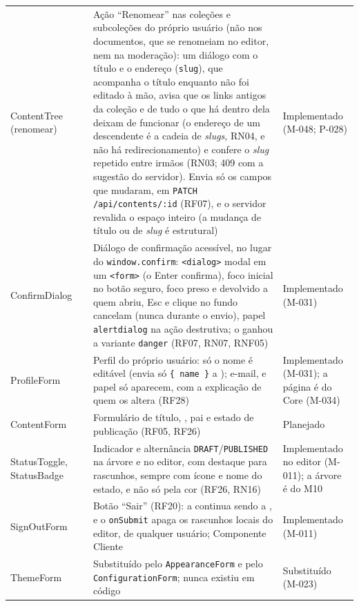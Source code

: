 \begin{longtable}{@{}L{3.3cm}L{2.9cm}L{6.0cm}L{2.2cm}@{}}
ContentTree (renomear) &  & Ação ``Renomear'' nas coleções e subcoleções do próprio usuário (não nos documentos, que se renomeiam no editor, nem na moderação): um diálogo com o título e o endereço (\texttt{slug}), que acompanha o título enquanto não foi editado à mão, avisa que os links antigos da coleção e de tudo o que há dentro dela deixam de funcionar (o endereço de um descendente é a cadeia de \emph{slugs}, RN04, e não há redirecionamento) e confere o \emph{slug} repetido entre irmãos (RN03; 409  com a sugestão do servidor). Envia só os campos que mudaram, em \texttt{PATCH /api/contents/:id} (RF07), e o servidor revalida o espaço inteiro (a mudança de título ou de \emph{slug} é estrutural) & Implementado (M-048; P-028)\\
ConfirmDialog &  & Diálogo de confirmação acessível, no lugar do \texttt{window.confirm}: \texttt{<dialog>} modal em um \texttt{<form>} (o Enter confirma), foco inicial no botão seguro, foco preso e devolvido a quem abriu, Esc e clique no fundo cancelam (nunca durante o envio), papel \texttt{alertdialog} na ação destrutiva; o  ganhou a variante \texttt{danger} (RF07, RN07, RNF05) & Implementado (M-031)\\
ProfileForm &  & Perfil do próprio usuário: só o nome é editável (envia só \texttt{\{ name \}} a ); e-mail,  e papel só aparecem, com a explicação de quem os altera (RF28) & Implementado (M-031); a página  é do Core (M-034)\\
ContentForm &  & Formulário de título, , pai e estado de publicação (RF05, RF26) & Planejado\\
StatusToggle, StatusBadge &  & Indicador e alternância \texttt{DRAFT}/\texttt{PUBLISHED} na árvore e no editor, com destaque para rascunhos, sempre com ícone e nome do estado, e não só pela cor (RF26, RN16) & Implementado no editor (M-011); a árvore é do M10\\
SignOutForm &  & Botão ``Sair'' (RF20): a  continua sendo a , e o \texttt{onSubmit} apaga os rascunhos locais do editor, de qualquer usuário; Componente Cliente & Implementado (M-011)\\
ThemeForm &  & Substituído pelo \texttt{AppearanceForm} e pelo \texttt{ConfigurationForm}; nunca existiu em código & Substituído (M-023)\\

\end{longtable}
